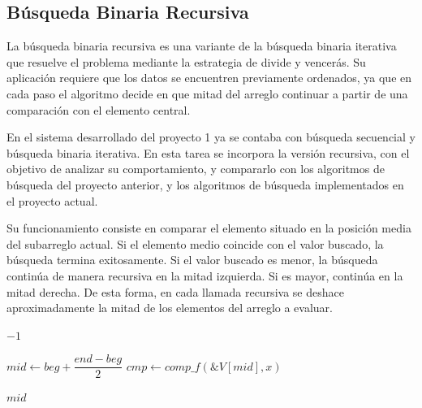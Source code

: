 \subsection{Búsqueda Binaria Recursiva}\label{sec:binario-recursivo}
La búsqueda binaria recursiva es una variante de la búsqueda binaria iterativa que resuelve el problema mediante la estrategia de divide y vencerás. Su aplicación requiere que los datos se encuentren previamente ordenados, ya que en cada paso el algoritmo decide en que mitad del arreglo continuar a partir de una comparación con el elemento central.

En el sistema desarrollado del proyecto 1 ya se contaba con búsqueda secuencial y búsqueda binaria iterativa. En esta tarea se incorpora la versión recursiva, con el objetivo de analizar su comportamiento, y compararlo con los algoritmos de búsqueda del proyecto anterior, y los algoritmos de búsqueda implementados en el proyecto actual.

Su funcionamiento consiste en comparar el elemento situado en la posición media del subarreglo actual. Si el elemento medio coincide con el valor buscado, la búsqueda termina exitosamente. Si el valor buscado es menor, la búsqueda continúa de manera recursiva en la mitad izquierda. Si es mayor, continúa en la mitad derecha. De esta forma, en cada llamada recursiva se deshace aproximadamente la mitad de los elementos del arreglo a evaluar.

\begin{algorithm}
    \caption{Búsqueda binaria recursiva de jugadores $\triangleright$ $V[beg..end]$}
    \begin{algorithmic}[1]
        
            \State \Return $-1$
        \EndIf

        \State $mid \gets beg + \dfrac{end - beg}{2}$
        \State $cmp \gets comp\_f(\&V[mid], x)$

            \State \Return $mid$
        \EndIf

            \State \Return {}
        \EndIf

        \State \Return {}

        \EndProcedure
    \end{algorithmic}
\end{algorithm}

